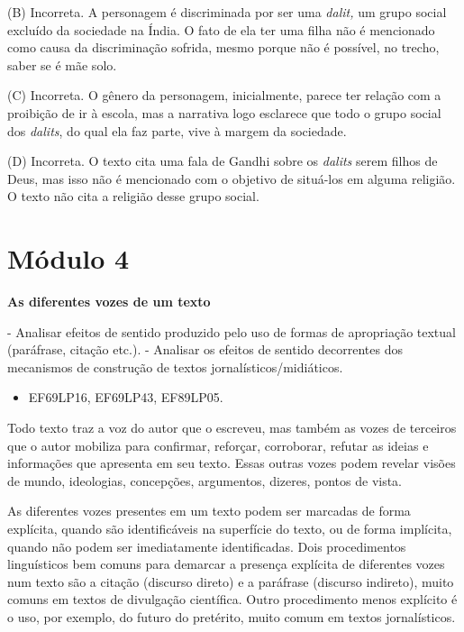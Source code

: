 (B) Incorreta. A personagem é discriminada por ser uma \emph{dalit,} um
grupo social excluído da sociedade na Índia. O fato de ela ter uma filha
não é mencionado como causa da discriminação sofrida, mesmo porque não é
possível, no trecho, saber se é mãe solo.

(C) Incorreta. O gênero da personagem, inicialmente, parece ter relação
com a proibição de ir à escola, mas a narrativa logo esclarece que todo
o grupo social dos \emph{dalits}, do qual ela faz parte, vive à margem
da sociedade.

(D) Incorreta. O texto cita uma fala de Gandhi sobre os \emph{dalits}
serem filhos de Deus, mas isso não é mencionado com o objetivo de
situá-los em alguma religião. O texto não cita a religião desse grupo
social.

\hypertarget{muxf3dulo-4}{%
\section{Módulo 4}\label{muxf3dulo-4}}

\textbf{As diferentes vozes de um texto}

 - Analisar efeitos de sentido produzido
pelo uso de formas de apropriação textual (paráfrase, citação etc.). -
Analisar os efeitos de sentido decorrentes dos mecanismos de construção
de textos jornalísticos/midiáticos.


\begin{itemize}
\tightlist
\item
  EF69LP16, EF69LP43, EF89LP05.
\end{itemize}

Todo texto traz a voz do autor que o escreveu, mas também as vozes de
terceiros que o autor mobiliza para confirmar, reforçar, corroborar,
refutar as ideias e informações que apresenta em seu texto. Essas outras
vozes podem revelar visões de mundo, ideologias, concepções, argumentos,
dizeres, pontos de vista.

As diferentes vozes presentes em um texto podem ser marcadas de forma
explícita, quando são identificáveis na superfície do texto, ou de forma
implícita, quando não podem ser imediatamente identificadas. Dois
procedimentos linguísticos bem comuns para demarcar a presença explícita
de diferentes vozes num texto são a citação (discurso direto) e a
paráfrase (discurso indireto), muito comuns em textos de divulgação
científica. Outro procedimento menos explícito é o uso, por exemplo, do
futuro do pretérito, muito comum em textos jornalísticos.

